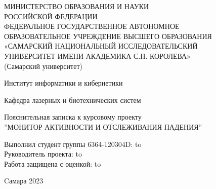 \begin{titlepage}
\newpage
\begin{doublespace}
\begin{center}
МИНИСТЕРСТВО ОБРАЗОВАНИЯ И НАУКИ \\
РОССИЙСКОЙ ФЕДЕРАЦИИ\\
ФЕДЕРАЛЬНОЕ ГОСУДАРСТВЕННОЕ АВТОНОМНОЕ\\
ОБРАЗОВАТЕЛЬНОЕ УЧРЕЖДЕНИЕ ВЫСШЕГО ОБРАЗОВАНИЯ\\
«САМАРСКИЙ НАЦИОНАЛЬНЫЙ ИССЛЕДОВАТЕЛЬСКИЙ\\
УНИВЕРСИТЕТ ИМЕНИ АКАДЕМИКА С.П. КОРОЛЕВА»	\\
(Самарский университет) \\
\end{center}

\vspace{4em}

\begin{center}
Институт информатики и кибернетики \\ 
\end{center}

\begin{center}
Кафедра лазерных и биотехнических систем \\ 
\end{center}


\vspace{3em}

\begin{center}
{Пояснительная записка к курсовому проекту\\''МОНИТОР АКТИВНОСТИ И ОТСЛЕЖИВАНИЯ ПАДЕНИЯ''}
\end{center}

\vspace{11em}




\newbox{\lbox}
\newlength{\maxl}
\setlength{\maxl}{\wd\lbox}
\hfill\parbox{15cm}{
\hspace*{5cm}\hspace*{-5cm}Выполнил студент группы 6364-120304D:\hfill\underline{\hspace{4em}}  \hbox to\\
\hspace*{5cm}\hspace*{-5cm}Руководитель проекта:\hfill\underline{\hspace{4em}}  \hbox to\\
\hspace*{5cm}\hspace*{-5cm}Работа защищена с оценкой:\hfill\underline{\hspace{4em}}  \hbox to\maxl{ \hfill }\\
}


\vspace{\fill}

\begin{center}Cамара 2023\end{center}

\end{doublespace}
\end{titlepage}
\setcounter{page}{2}